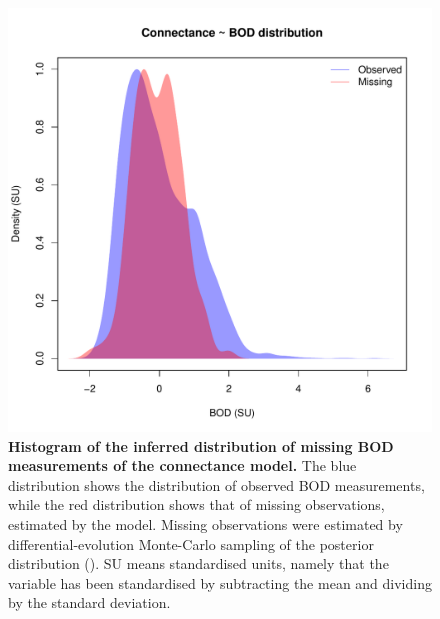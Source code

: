 \documentclass[11pt, oneside]{article}
\begin{document}
\begin{figure}[H]
\begin{center}
\includegraphics[page=1, width=1\linewidth]{b0_6_2/out_con/fig_hist_missing_bod.pdf}
\caption{
    \textbf{Histogram of the inferred distribution of missing BOD measurements of the connectance model.}
    The blue distribution shows the distribution of observed BOD measurements, while the red distribution shows that of missing observations, estimated by the model.
    Missing observations were estimated by differential-evolution Monte-Carlo sampling of the posterior distribution (\cite{TerBraak2006}).
    SU means standardised units, namely that the variable has been standardised by subtracting the mean and dividing by the standard deviation.
} 
\end{center}
\end{figure}
\end{document}
